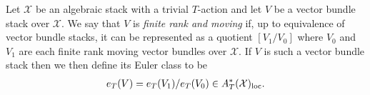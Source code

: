 \begin{definition}\label{rl-000T}\label{defn:euler-class-of-vector-bundle-stack}
  Let \(\mathcal X\) be an algebraic stack with a trivial \(T\)-action and let $V$ be a vector bundle stack over $\mathcal X$. We say that \(V\) is \emph{finite rank and moving} if, up to equivalence of vector bundle stacks, it can be represented as a quotient \([V_1/V_0]\) where \(V_0\) and \(V_1\) are each finite rank moving vector bundles over \(\mathcal X\). If \(V\) is such a vector bundle stack then we then define its Euler class to be
  \begin{align*}
    e_T(V) = e_T(V_1)/e_T(V_0) \in A^*_T(\mathcal X)_{\operatorname{loc}}.
  \end{align*}
\end{definition}
